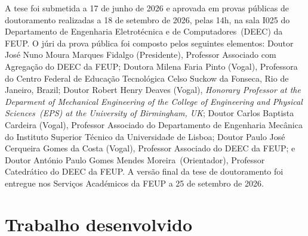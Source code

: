 \documentclass[11pt,a4paper,oneside]{article}
\begin{document}
A tese foi submetida a 17 de junho de 2026 e aprovada em provas públicas de
doutoramento realizadas a 18 de setembro de 2026, pelas 14h, na sala I025 do
Departamento de Engenharia Eletrotécnica e de Computadores~(DEEC) da FEUP.
O júri da prova pública foi composto pelos seguintes elementos:
Doutor José Nuno Moura Marques Fidalgo (Presidente), Professor Associado com
Agregação do DEEC da FEUP;
Doutora Milena Faria Pinto (Vogal), Professora do Centro Federal de Educação
Tecnológica Celso Suckow da Fonseca, Rio de Janeiro, Brazil;
Doutor Robert Henry Deaves (Vogal), \textit{Honorary Professor at the Deparment
of Mechanical Engineering of the College of Engineering and Physical
Sciences~(EPS) at the University of Birmingham, UK};
Doutor Carlos Baptista Cardeira (Vogal), Professor Associado do Departamento de
Engenharia Mecânica do Instituto Superior Técnico da Universidade de Lisboa;
Doutor Paulo José Cerqueira Gomes da Costa (Vogal), Professor Associado do DEEC
da FEUP; e Doutor António Paulo Gomes Mendes Moreira~(Orientador), Professor
Catedrático do DEEC da FEUP.
A versão final da tese de doutoramento foi entregue nos
Serviços Académicos da FEUP a 25 de setembro de 2026.

\section{Trabalho desenvolvido}\label{sec:trabalho}
\end{document}
